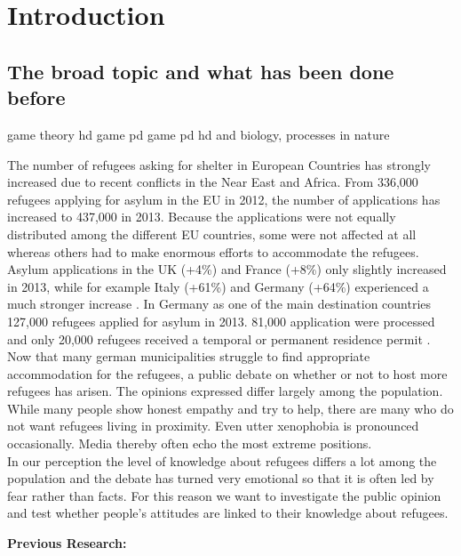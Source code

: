 \section{Introduction}

\subsection{The broad topic and what has been done before}

game theory
hd game
pd game 
pd hd and biology, processes in nature

The number of refugees asking for shelter in European Countries has strongly increased due to recent conflicts in the Near East and Africa.
From 336,000 refugees applying for asylum in the EU in 2012, the number of applications has increased to 437,000 in 2013. Because the applications were not equally distributed among the different EU countries, some were not affected at all whereas others had to make enormous efforts to accommodate the refugees. Asylum applications in the UK (+4\%) and France (+8\%) only slightly increased in 2013, while for example Italy (+61\%) and Germany (+64\%) experienced a much stronger increase \citep{BAMF2014}. In Germany as one of the main destination countries 127,000 refugees applied for asylum in 2013. 81,000 application were processed and only 20,000 refugees received a temporal or permanent residence permit \citep{BAMF2013}.
Now that many german municipalities struggle to find appropriate accommodation for the refugees, a public debate on whether or not to host more refugees has arisen. The opinions expressed differ largely among the population. While many people show honest empathy and try to help, there are many who do not want refugees living in proximity. Even utter xenophobia is pronounced occasionally. Media thereby often echo the most extreme positions.\\
In our perception the level of knowledge about refugees differs a lot among the population and the debate has turned very emotional so that it is often led by fear rather than facts. For this reason we want to investigate the public opinion and test whether people's attitudes are linked to their knowledge about refugees.

\textbf{Previous Research:}

